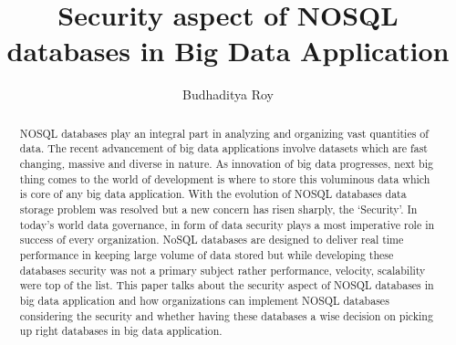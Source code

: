

\title{Security aspect of NOSQL databases in Big Data Application}


\author{Budhaditya Roy}

\renewcommand{\shortauthors}{B.Roy.}


\begin{abstract}
NOSQL databases play an integral part in analyzing and organizing vast quantities of data. The recent advancement of big data applications involve datasets which are fast changing, massive and diverse in nature. As innovation of big data progresses, next big thing comes to the world of development is where to store this voluminous data which is core of any big data application. With the evolution of NOSQL databases data storage problem was resolved but a new concern has risen sharply, the ‘Security’. In today’s world data governance, in form of data security plays a most imperative role in success of every organization.  NoSQL databases are designed to deliver real time performance in keeping large volume of data stored but while developing these databases security was not a primary subject rather performance, velocity, scalability were top of the list. This paper talks about the security aspect of NOSQL databases in big data application and how organizations can implement NOSQL databases considering the security and whether having these databases a wise decision on picking up right databases in big data application.
\end{abstract}



\maketitle

